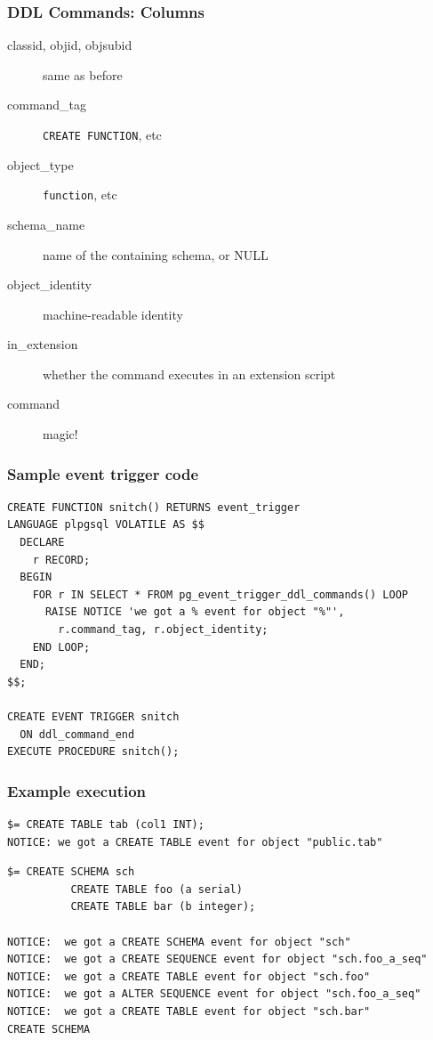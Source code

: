 \frame
{ \frametitle{DDL Commands: Columns}
\begin{description}
\item[classid, objid, objsubid] same as before
\item[command\_tag] \texttt{CREATE FUNCTION}, etc
\item[object\_type] \texttt{function}, etc
 \item[schema\_name] name of the containing schema, or NULL
 \item[object\_identity] machine-readable identity
 \item[in\_extension] whether the command executes in an extension script
 \item[command] magic!
\end{description}

}

\begin{frame}[fragile]
\frametitle{Sample event trigger code}

\footnotesize
\begin{lstlisting}
CREATE FUNCTION snitch() RETURNS event_trigger
LANGUAGE plpgsql VOLATILE AS $$
  DECLARE
    r RECORD;
  BEGIN
    FOR r IN SELECT * FROM pg_event_trigger_ddl_commands() LOOP
      RAISE NOTICE 'we got a % event for object "%"',
        r.command_tag, r.object_identity;
    END LOOP;
  END;
$$;

CREATE EVENT TRIGGER snitch
  ON ddl_command_end
EXECUTE PROCEDURE snitch();
\end{lstlisting}
\end{frame}

\begin{frame}[fragile]
\frametitle{Example execution}

\footnotesize
\begin{lstlisting}
$= CREATE TABLE tab (col1 INT);
NOTICE: we got a CREATE TABLE event for object "public.tab"

\end{lstlisting}
\pause
\begin{lstlisting}
$= CREATE SCHEMA sch
          CREATE TABLE foo (a serial)
          CREATE TABLE bar (b integer);

NOTICE:  we got a CREATE SCHEMA event for object "sch"
NOTICE:  we got a CREATE SEQUENCE event for object "sch.foo_a_seq"
NOTICE:  we got a CREATE TABLE event for object "sch.foo"
NOTICE:  we got a ALTER SEQUENCE event for object "sch.foo_a_seq"
NOTICE:  we got a CREATE TABLE event for object "sch.bar"
CREATE SCHEMA

\end{lstlisting}
\end{frame}

